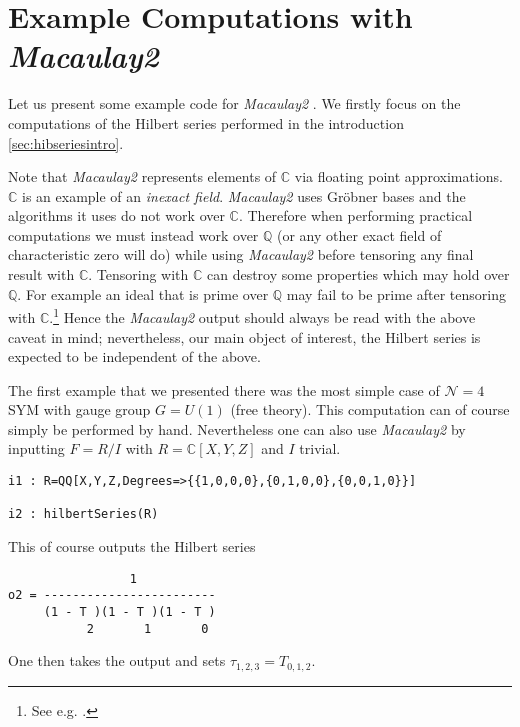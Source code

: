 \documentclass[main.tex]{subfiles}
\begin{document}
\section{Example Computations with \textit{Macaulay2}}
Let us present some example code for \textit{Macaulay2} \cite{M2}. 
We firstly focus on the computations of the Hilbert series performed in the introduction \ref{sec:hibseriesintro}.

Note that \textit{Macaulay2} represents elements of $\mathbb{C}$ via floating point approximations. $\mathbb{C}$ is an example of an \textit{inexact field}. \textit{Macaulay2} uses Gr\"obner bases and the algorithms it uses do not work over $\mathbb{C}$. Therefore when performing practical computations we must instead work over $\mathbb{Q}$ (or any other exact field of characteristic zero will do) while using \textit{Macaulay2} before tensoring any final result with $\mathbb{C}$. Tensoring with $\mathbb{C}$ can destroy some properties which may hold over $\mathbb{Q}$. For example an ideal that is prime over $\mathbb{Q}$ may fail to be prime after tensoring with $\mathbb{C}$.\footnote{See e.g. \cite{318694}.} Hence the  \textit{Macaulay2} output should always be read with the above caveat in mind; nevertheless, our main object of interest, the Hilbert series is expected to be independent of the above.

The first example that we presented there was the most simple case of $\mathcal{N}=4$ SYM with gauge group $G=U(1)$ (free theory). This computation can of course simply be performed by hand. Nevertheless one can also use \textit{Macaulay2} by inputting $F=R/I$ with $R=\mathbb{C}[X,Y,Z]$ and $I$ trivial.
\begin{verbatim}
i1 : R=QQ[X,Y,Z,Degrees=>{{1,0,0,0},{0,1,0,0},{0,0,1,0}}]

i2 : hilbertSeries(R)
\end{verbatim}
This of course outputs the Hilbert series
\begin{verbatim}
                 1
o2 = ------------------------
     (1 - T )(1 - T )(1 - T )
           2       1       0
\end{verbatim}
One then takes the output and sets $\tau_{1,2,3}=T_{0,1,2}$.
\end{document}
